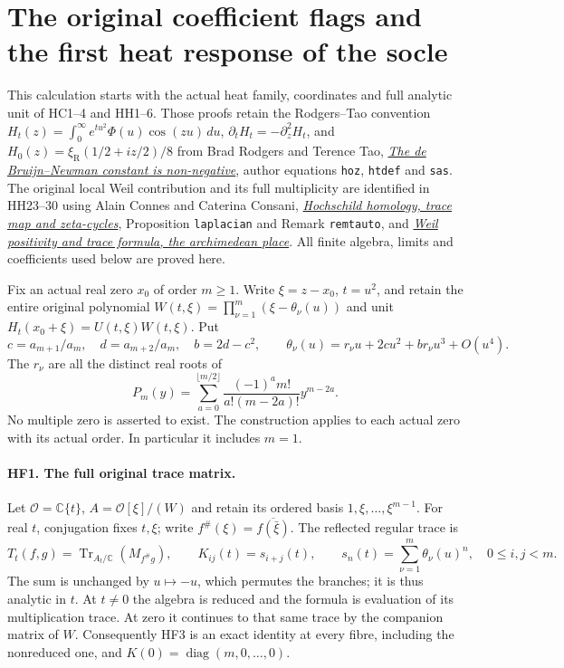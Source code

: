 \section{The original coefficient flags and the first heat response of the socle}
\label{sec:heat-flag-response}

This calculation starts with the actual heat family, coordinates and
full analytic unit of HC1--4 and HH1--6. Those proofs retain the
Rodgers--Tao convention $H_t(z)=\int_0^\infty e^{tu^2}\Phi(u)\cos(zu)\,du$,
$\partial_tH_t=-\partial_z^2H_t$, and
$H_0(z)=\xi_{\mathrm R}(1/2+iz/2)/8$ from
Brad Rodgers and Terence Tao,
\href{https://arxiv.org/abs/1801.05914v5}{\emph{The de Bruijn--Newman constant is non-negative}},
author equations \texttt{hoz}, \texttt{htdef} and \texttt{sas}.
The original local Weil contribution and its full multiplicity are
identified in HH23--30 using Alain Connes and Caterina Consani,
\href{https://arxiv.org/abs/2207.10419}{\emph{Hochschild homology, trace map and zeta-cycles}},
Proposition \texttt{laplacian} and Remark \texttt{remtauto}, and
\href{https://arxiv.org/abs/2006.13771v1}{\emph{Weil positivity and trace formula, the archimedean place}}.
All finite algebra, limits and coefficients used below are proved here.

Fix an actual real zero $x_0$ of order $m\ge1$. Write $\xi=z-x_0$,
$t=u^2$, and retain the entire original polynomial
$W(t,\xi)=\prod_{\nu=1}^m(\xi-\theta_\nu(u))$ and unit
$H_t(x_0+\xi)=U(t,\xi)W(t,\xi)$. Put
\[
 c=a_{m+1}/a_m,\quad d=a_{m+2}/a_m,\quad b=2d-c^2,
 \qquad
 \theta_\nu(u)=r_\nu u+2cu^2+b r_\nu u^3+O(u^4).
 \tag{HF1}
\]
The $r_\nu$ are all the distinct real roots of
\[
 P_m(y)=\sum_{a=0}^{\lfloor m/2\rfloor}
 \frac{(-1)^a m!}{a!(m-2a)!}y^{m-2a}.
 \tag{HF2}
\]
No multiple zero is asserted to exist. The construction applies to
each actual zero with its actual order. In particular it includes $m=1$.

\paragraph{HF1. The full original trace matrix.}
Let $\mathcal O=\mathbb C\{t\}$,
$A=\mathcal O[\xi]/(W)$ and retain its ordered basis
$1,\xi,\ldots,\xi^{m-1}$. For real $t$, conjugation fixes $t,\xi$;
write $f^\#(\xi)=\overline{f(\bar\xi)}$. The reflected regular trace is
\[
 T_t(f,g)=\operatorname{Tr}_{A_t/\mathbb C}(M_{f^\#g}),
 \qquad K_{ij}(t)=s_{i+j}(t),\qquad
 s_n(t)=\sum_{\nu=1}^m\theta_\nu(u)^n,
 \quad 0\le i,j<m.
 \tag{HF3}
\]
The sum is unchanged by $u\mapsto-u$, which permutes the branches;
it is thus analytic in $t$. At $t\ne0$ the algebra is reduced and
the formula is evaluation of its multiplication trace. At zero it
continues to that same trace by the companion matrix of $W$.
Consequently HF3 is an exact identity at every fibre, including
the nonreduced one, and $K(0)=\operatorname{diag}(m,0,\ldots,0)$.

